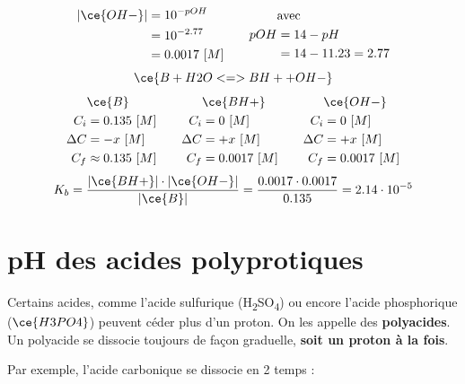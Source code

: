 \documentclass[
  11pt,
  a4paper,
  openany]{book}
\begin{document}
\begin{Answer}
\[
\begin{split}
|\ce{OH-}| &= 10^{-pOH} \\
 &= 10^{-2.77} \\
 &= 0.0017\ [M]
\end{split}
\qquad
\begin{split}
&\text{avec} \\
pOH &= 14 - pH \\
  &= 14 - 11.23 = 2.77
\end{split}
\]
\[
\ce{B + H2O <=> BH+ + OH-}
\]
\[
\begin{split}
&\ce{B}\\
C_i &= 0.135\ [M] \\
\Delta C &= - x\ [M] \\
C_f &\approx 0.135\ [M] \\
\end{split}
\qquad
\begin{split}
&\ce{BH+}\\
C_i &= 0\ [M] \\
\Delta C &= + x\ [M] \\
C_f &= 0.0017\ [M] \\
\end{split}
\qquad
\begin{split}
&\ce{OH-}\\
C_i &= 0\ [M] \\
\Delta C &= + x\ [M] \\
C_f &= 0.0017\ [M] \\
\end{split}
\]
\[
K_b = \frac{|\ce{BH+}| \cdot |\ce{OH-}|}{|\ce{B}|} = \frac{0.0017 \cdot 0.0017}{0.135} = 2.14 \cdot 10^{-5}
\]

\end{Answer}

\clearpage

\section{pH des acides polyprotiques}\label{ph-des-acides-polyprotiques}

Certains acides, comme l'acide sulfurique (H\textsubscript{2}SO\textsubscript{4}) ou encore l'acide phosphorique (\(\ce{H3PO4}\)) peuvent céder plus d'un proton. On les appelle des \textbf{polyacides}. Un polyacide se dissocie toujours de façon graduelle, \textbf{soit un proton à la fois}.

Par exemple, l'acide carbonique se dissocie en 2 temps :
\end{document}
